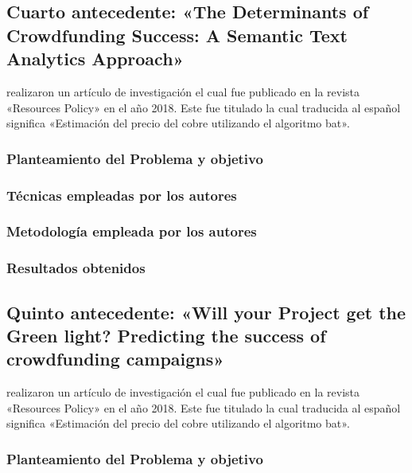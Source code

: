 \subsection{Cuarto antecedente: «The Determinants of Crowdfunding Success: A Semantic Text Analytics Approach» \citep*{pr_yuan2016textanalytics}}
\citeauthor{pr_yuan2016textanalytics} realizaron un artículo de investigación el cual fue publicado en la revista «Resources Policy» en el año 2018. Este fue titulado  la cual traducida al español significa «Estimación del precio del cobre utilizando el algoritmo bat».

\subsubsection{Planteamiento del Problema y objetivo }


\subsubsection{Técnicas empleadas por los autores}


\subsubsection{Metodología empleada por los autores}


\subsubsection{Resultados obtenidos}



\subsection{Quinto antecedente: «Will your Project get the Green light? Predicting the success of crowdfunding campaigns» \citep*{pr_chen2015predcrowd}}
\citeauthor{pr_chen2015predcrowd} realizaron un artículo de investigación el cual fue publicado en la revista «Resources Policy» en el año 2018. Este fue titulado  la cual traducida al español significa «Estimación del precio del cobre utilizando el algoritmo bat».

\subsubsection{Planteamiento del Problema y objetivo }


